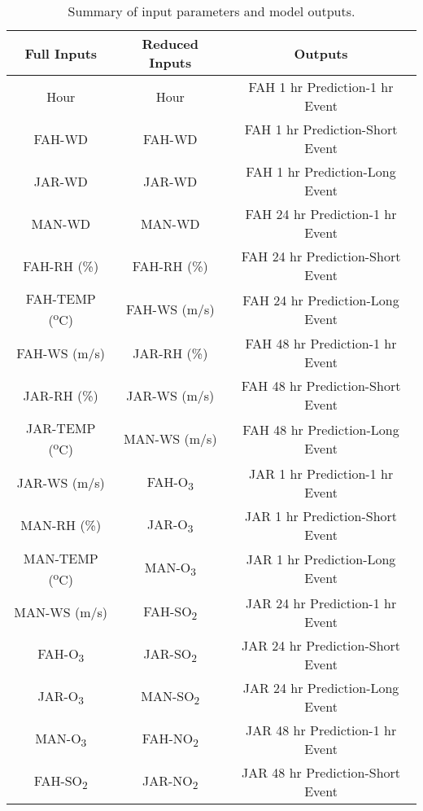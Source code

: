 \begin{table}[H]
\centering
\caption{Summary of input parameters and model outputs.}
\label{tb:InputSummary}
\begin{tabular}{@{}ccc@{}}
\toprule
\textbf{Full Inputs} & \textbf{Reduced Inputs} & \textbf{Outputs}                 \\ \midrule
Hour                 & Hour                    & FAH 1 hr Prediction-1 hr Event   \\    
FAH-WD               & FAH-WD                  & FAH 1 hr Prediction-Short Event  \\
JAR-WD               & JAR-WD                  & FAH 1 hr Prediction-Long Event   \\
MAN-WD               & MAN-WD                  & FAH 24 hr Prediction-1 hr Event  \\
FAH-RH (\%)          & FAH-RH (\%)             & FAH 24 hr Prediction-Short Event \\
FAH-TEMP (\textsuperscript{o}C)        & FAH-WS (m/s)            & FAH 24 hr Prediction-Long Event  \\
FAH-WS (m/s)         & JAR-RH (\%)             & FAH 48 hr Prediction-1 hr Event  \\
JAR-RH (\%)          & JAR-WS (m/s)            & FAH 48 hr Prediction-Short Event \\
JAR-TEMP (\textsuperscript{o}C)        & MAN-WS (m/s)            & FAH 48 hr Prediction-Long Event  \\
JAR-WS (m/s)         & FAH-O\textsubscript{3}                  & JAR 1 hr Prediction-1 hr Event   \\
MAN-RH (\%)          & JAR-O\textsubscript{3}                  & JAR 1 hr Prediction-Short Event  \\
MAN-TEMP (\textsuperscript{o}C)        & MAN-O\textsubscript{3}                  & JAR 1 hr Prediction-Long Event   \\
MAN-WS (m/s)         & FAH-SO\textsubscript{2}                 & JAR 24 hr Prediction-1 hr Event  \\
FAH-O\textsubscript{3}               & JAR-SO\textsubscript{2}                 & JAR 24 hr Prediction-Short Event \\
JAR-O\textsubscript{3}               & MAN-SO\textsubscript{2}                & JAR 24 hr Prediction-Long Event  \\
MAN-O\textsubscript{3}               & FAH-NO\textsubscript{2}                 & JAR 48 hr Prediction-1 hr Event  \\
FAH-SO\textsubscript{2}              & JAR-NO\textsubscript{2}                 & JAR 48 hr Prediction-Short Event \\

\end{tabular}
\end{table}

